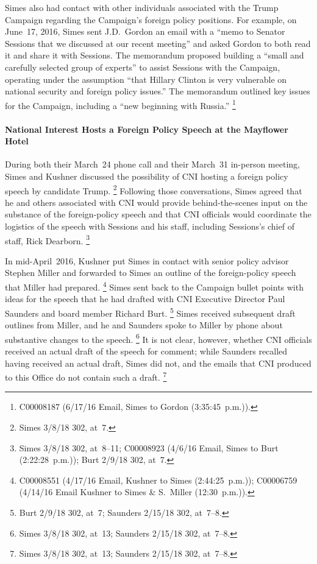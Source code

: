 Simes also had contact with other individuals associated with the Trump Campaign regarding the Campaign's foreign policy positions.
For example, on June~17, 2016, Simes sent J.D.~Gordon an email with a ``memo to Senator Sessions that we discussed at our recent meeting'' and asked Gordon to both read it and share it with Sessions.
The memorandum proposed building a ``small and carefully selected group of experts'' to assist Sessions with the Campaign, operating under the assumption ``that Hillary Clinton is very vulnerable on national security and foreign policy issues.''
The memorandum outlined key issues for the Campaign, including a ``new beginning with Russia.''%
\footnote{C00008187 (6/17/16 Email, Simes to Gordon (3:35:45~p.m.)).}

\paragraph{National Interest Hosts a Foreign Policy Speech at the Mayflower Hotel}

During both their March~24 phone call and their March~31 in-person meeting, Simes and Kushner discussed the possibility of CNI hosting a foreign policy speech by candidate Trump.%
\footnote{Simes 3/8/18 302, at~7.}
Following those conversations, Simes agreed that he and others associated with CNI would provide behind-the-scenes input on the substance of the foreign-policy speech and that CNI officials would coordinate the logistics of the speech with Sessions and his staff, including Sessions's chief of staff, Rick Dearborn.%
\footnote{Simes 3/8/18 302, at~8--11;
C00008923 (4/6/16 Email, Simes to Burt (2:22:28~p.m.));
Burt 2/9/18 302, at~7.}

In mid-April~2016, Kushner put Simes in contact with senior policy advisor Stephen Miller and forwarded to Simes an outline of the foreign-policy speech that Miller had prepared.%
\footnote{C00008551 (4/17/16 Email, Kushner to Simes (2:44:25~p.m.));
C00006759 (4/14/16 Email Kushner to Simes \& S.~Miller (12:30~p.m.)).}
Simes sent back to the Campaign bullet points with ideas for the speech that he had drafted with CNI Executive Director Paul Saunders and board member Richard Burt.%
\footnote{Burt 2/9/18 302, at~7;
Saunders 2/15/18 302, at~7--8.}
Simes received subsequent draft outlines from Miller, and he and Saunders spoke to Miller by phone about substantive changes to the speech.%
\footnote{Simes 3/8/18 302, at~13;
Saunders 2/15/18 302, at~7--8.}
It is not clear, however, whether CNI officials received an actual draft of the speech for comment; while Saunders recalled having received an actual draft, Simes did not, and the emails that CNI produced to this Office do not contain such a draft.%
\footnote{Simes 3/8/18 302, at~13;
Saunders 2/15/18 302, at~7--8.}

